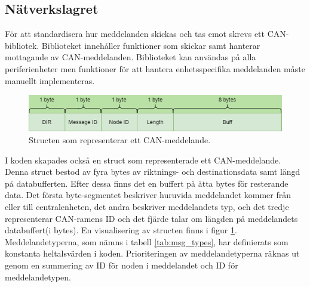 \subsection{Nätverkslagret}
\label{sec:nätverkslagret}
För att standardisera hur meddelanden skickas och tas emot skrevs ett CAN-bibliotek. Biblioteket innehåller funktioner som skickar samt hanterar mottagande av CAN-meddelanden. Biblioteket kan användas på alla periferienheter men funktioner för att hantera enhetsspecifika meddelanden måste manuellt implementeras.
\newline\newline


\begin{figure}[h]
    \centering
    \includegraphics[scale=0.6]{dokumentation/projektrapport/IMAGES/can_msg_struct.png}
    \caption{Structen som representerar ett CAN-meddelande.}
    \label{fig:can_msg_struct}
\end{figure}

I koden skapades också en struct som representerade ett CAN-meddelande. Denna struct bestod av fyra bytes av riktnings- och destinationsdata samt längd på databufferten. Efter dessa finns det en buffert på åtta bytes för resterande data. Det första byte-segmentet beskriver huruvida meddelandet kommer från eller till centralenheten, det andra beskriver meddelandets typ, och det tredje representerar CAN-ramens ID och det fjärde talar om längden på meddelandets databuffert(i bytes). En visualisering av structen finns i figur \ref{fig:can_msg_struct}.
\newline\newline
Meddelandetyperna, som nämns i tabell \ref{tab:msg_types}, har definierats som konstanta heltalsvärden i koden. Prioriteringen av meddelandetyperna räknas ut genom en summering av ID för noden i meddelandet och ID för meddelandetypen. 



